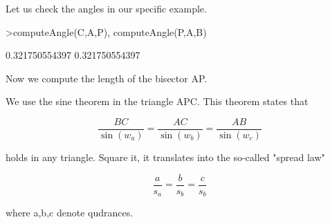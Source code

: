 \documentclass[a4paper,10pt]{article}
\begin{document}
\begin{eulernotebook}
\begin{eulercomment}
\begin{eulercomment}
\begin{eulercomment}
\begin{eulercomment}
\begin{eulerprompt}
\end{eulerprompt}
\begin{eulercomment}
Let us check the angles in our specific example.
\end{eulercomment}
\begin{eulerprompt}
>computeAngle(C,A,P), computeAngle(P,A,B)
\end{eulerprompt}
\begin{euleroutput}
  0.321750554397
  0.321750554397
\end{euleroutput}
\begin{eulercomment}
Now we compute the length of the bisector AP.

We use the sine theorem in the triangle APC. This theorem states that

\end{eulercomment}
\begin{eulerformula}
\[
\frac{BC}{\sin(w_a)} = \frac{AC}{\sin(w_b)} = \frac{AB}{\sin(w_c)}
\]
\end{eulerformula}
\begin{eulercomment}
holds in any triangle. Square it, it translates into the so-called
"spread law"

\end{eulercomment}
\begin{eulerformula}
\[
\frac{a}{s_a} = \frac{b}{s_b} = \frac{c}{s_b}
\]
\end{eulerformula}
\begin{eulercomment}
where a,b,c denote qudrances.


\end{eulercomment}
\end{eulercomment}
\end{eulercomment}
\end{eulercomment}
\end{eulercomment}
\end{eulernotebook}
\end{document}
